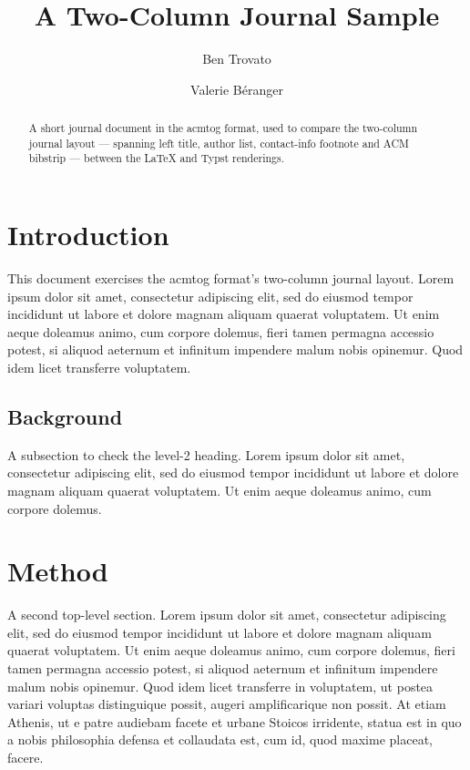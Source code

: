 \documentclass[acmtog]{acmart}
\begin{document}
\title{A Two-Column Journal Sample}
\author{Ben Trovato}
\author{Valerie B\'eranger}
\renewcommand{\shortauthors}{Trovato et al.}
\begin{abstract}
  A short journal document in the acmtog format, used to compare the two-column
  journal layout — spanning left title, author list, contact-info footnote and
  ACM bibstrip — between the LaTeX and Typst renderings.
\end{abstract}
\maketitle

\section{Introduction}
This document exercises the acmtog format's two-column journal layout. Lorem ipsum
dolor sit amet, consectetur adipiscing elit, sed do eiusmod tempor incididunt ut
labore et dolore magnam aliquam quaerat voluptatem. Ut enim aeque doleamus animo,
cum corpore dolemus, fieri tamen permagna accessio potest, si aliquod aeternum et
infinitum impendere malum nobis opinemur. Quod idem licet transferre voluptatem.

\subsection{Background}
A subsection to check the level-2 heading. Lorem ipsum dolor sit amet, consectetur
adipiscing elit, sed do eiusmod tempor incididunt ut labore et dolore magnam
aliquam quaerat voluptatem. Ut enim aeque doleamus animo, cum corpore dolemus.

\section{Method}
A second top-level section. Lorem ipsum dolor sit amet, consectetur adipiscing
elit, sed do eiusmod tempor incididunt ut labore et dolore magnam aliquam quaerat
voluptatem. Ut enim aeque doleamus animo, cum corpore dolemus, fieri tamen
permagna accessio potest, si aliquod aeternum et infinitum impendere malum nobis
opinemur. Quod idem licet transferre in voluptatem, ut postea variari voluptas
distinguique possit, augeri amplificarique non possit. At etiam Athenis, ut e
patre audiebam facete et urbane Stoicos irridente, statua est in quo a nobis
philosophia defensa et collaudata est, cum id, quod maxime placeat, facere.
\end{document}
